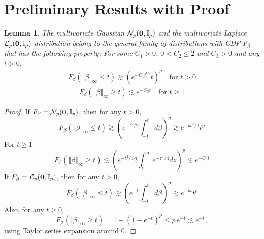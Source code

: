 \documentclass[12pt]{article}
\newcommand{\norm}[1]{\left\Vert#1\right\Vert}
\newcommand{\1}{\mathbb{I}}
\theoremstyle{plain}
\newtheorem{lemma}[theorem]{Lemma}
\theoremstyle{definition}
\theoremstyle{remark}
\begin{document}
\section{Preliminary Results with Proof}
\begin{lemma}
The multivariate Gaussian $\mathcal{N}_p ({\bf 0}, \mathbb{I}_p)$ and the multivariate Laplace $\mathcal{L}_p ({\bf 0}, \mathbb{I}_p)$ distribution belong to the general family of distributions with CDF $F_\beta$ that has the following property:
For some $C_1>0$, $0 < C_2 \le 2$ and $C_3 > 0$ and any $t>0$,
    \begin{align}
        F_\beta(\norm{\beta}_\infty \le t) \gtrsim \left (e^{-C_1 t^{C_2}} t \right)^{p} \quad \text{for $t>0$}
    \end{align}
    \vspace{-10pt}
    \begin{align}
        F_\beta(\norm{\beta}_\infty \ge t) \lesssim e^{-C_3 t} \quad \text{for $t \ge 1$}
    \end{align}
\end{lemma}
\begin{proof}
If $F_\beta= \mathcal{N}_p ({\bf 0}, \mathbb{I}_p)$, then for any $t>0$,
\begin{equation*}
    F_\beta(\norm{\beta}_\infty \le t) \gtrsim \left (e^{- t^2/2} \int_{-t}^t d\beta \right )^p \gtrsim e^{-p t^2 / 2}t^p
\end{equation*}
For $t \ge 1$
\begin{equation*}
    F_\beta(\norm{\beta}_\infty \ge t) \lesssim  \left (e^{-t^2/4} 2\int_{t}^\infty e^{-z^2/4} dz \right )^p \lesssim e^{-C_3t}
\end{equation*}
If $F_\beta = \mathcal{L}_p ({\bf 0}, \mathbb{I}_p)$, then for any $t > 0$,
\begin{equation*}
    F_\beta(\norm{\beta}_\infty \le t) \gtrsim \left (e^{- t} \int_{-t}^t d\beta \right )^p \gtrsim e^{-p t}t^p
\end{equation*}
Also, for any $t \ge 0$,
\begin{equation*}
    F_\beta(\norm{\beta}_\infty \ge t)
    = 1 - \left(1 - e^{-t}\right)^p
    \le p\, e^{-t}
    \lesssim e^{-t},
\end{equation*}
using Taylor series expansion around $0$.
\end{proof}
\end{document}
